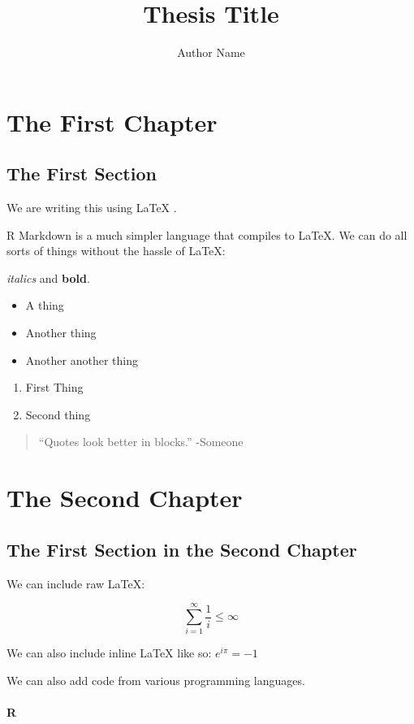 \documentclass[final,12pt,]{CSUNthesis}
\author{Author Name}
\title{Thesis Title}
\begin{document}
\chapter{The First Chapter}\label{the-first-chapter}

\section{The First Section}\label{the-first-section}

We are writing this using LaTeX .

R Markdown is a much simpler language that compiles to LaTeX. We can do
all sorts of things without the hassle of LaTeX:

\emph{italics} and \textbf{bold}.

\begin{itemize}
\item
  A thing
\item
  Another thing
\item
  Another another thing
\end{itemize}

\begin{enumerate}
\def\labelenumi{\arabic{enumi}.}
\item
  First Thing
\item
  Second thing
\end{enumerate}

\begin{quote}
``Quotes look better in blocks.'' -Someone
\end{quote}

\chapter{The Second Chapter}\label{the-second-chapter}

\section{The First Section in the Second
Chapter}\label{the-first-section-in-the-second-chapter}

We can include raw LaTeX:

\[ \sum_{i=1}^{\infty} \frac{1}{i} \leq \infty \]

We can also include inline LaTeX like so: \(e^{i \pi}=-1\)

We can also add code from various programming languages.

\subsubsection{R}\label{r}
\end{document}
